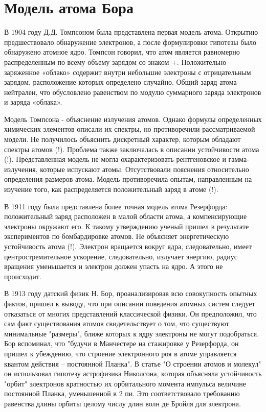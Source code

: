 
\newpage
\chapter{Модель атома Бора}
\par    В 1904 году Д.Д. Томпсоном была представлена первая модель атома. Открытию предшествовало обнаружение электронов, а после формулировки гипотезы было обнаружено атомное ядро. Томпсон говорил, что атом является равномерно распределенным по всему объему зарядом со знаком +. Положительно заряженное «облако» содержит внутри небольшие электроны с отрицательным зарядом, расположение которых определено случайно.  Общий заряд атома нейтрален, что обусловлено равенством по модулю суммарного заряда электронов и заряда «облака». 
\par Модель Томпсона - объяснение излучения атомов. Однако формулы определенных химических элементов описали их спектры, но противоречили рассматриваемой модели. Не получилось объяснить дискретный характер, которым обладают спектры атомов (!). Проблема также заключалась в описании устойчивости атома (!). Представленная модель не могла охарактеризовать рентгеновское и гамма-излучения, которые испускают атомы. Отсутствовали пояснения относительно определения размеров атома. Модель противоречила опытам, направленным на изучение того, как распределяется положительный заряд в атоме (!). 
\par В 1911 году была представлена более точная модель атома Резерфорда: положительный заряд расположен в малой области атома, а компенсирующие электроны окружают его. К такому утверждению ученый пришел в результате экспериментов по бомбардировке атомов. Не объясняет энергетическую устойчивость атома (!). Электрон вращается вокруг ядра, следовательно, имеет центростремительное ускорение, следовательно, излучает энергию, радиус вращения уменьшается и электрон должен упасть на ядро. А этого не происходит.
\par В 1913 году датский физик Н. Бор, проанализировав всю совокупность опытных фактов, пришел к выводу, что при описании поведения атомных систем следует отказаться от многих представлений классической физики. Он предположил, что сам факт существования атомов свидетельствует о том, что существуют минимальные "размеры", ближе которых к ядру электроны не могут подобраться. Бор вспоминал, что "будучи в Манчестере на стажировке у Резерфорда, он пришел к убеждению, что строение электронного роя в атоме управляется квантом действия – постоянной Планка". В статье "О строении атомов и молекул" он использовал гипотезу астрофизика Николсона, которая объясняла устойчивость "орбит" электронов кратностью их орбитального момента импульса величине постоянной Планка, уменьшенной в 2 пи. Это соответствовало требованию равенства длины орбиты целому числу длин волн де Бройля для электрона. 
